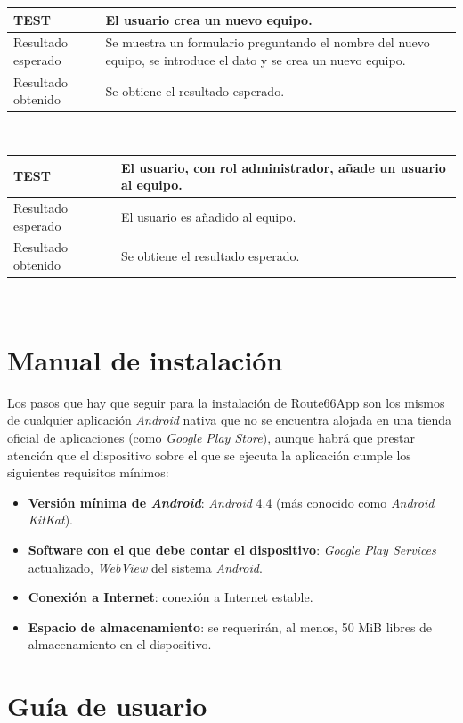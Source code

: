 \documentclass[twoside]{report}
\newcommand\addrow[2]{#1 &#2\\ }
\newcommand\addheading[2]{#1 &#2\\ \hline}
\newcommand\tabularhead{\begin{tabular}{lp{0.7\textwidth}}
\hline
}
\newenvironment{test}{\tabularhead}
{\hline\end{tabular}}
\begin{document}
\vspace{0.5cm}

\begin{test}
  \addheading{\textbf{TEST\arabic{test}}}{El usuario crea un nuevo equipo.} 
  \addrow{Resultado esperado}{Se muestra un formulario preguntando el nombre del nuevo equipo, se introduce el dato y se crea un nuevo equipo.}
  \addrow{Resultado obtenido}{Se obtiene el resultado esperado.}
\end{test}\\

\vspace{0.5cm}

\begin{test}
  \addheading{\textbf{TEST\arabic{test}}}{El usuario, con rol administrador, añade un usuario al equipo.} 
  \addrow{Resultado esperado}{El usuario es añadido al equipo.}
  \addrow{Resultado obtenido}{Se obtiene el resultado esperado.}
\end{test}\\

\section{Manual de instalación}

Los pasos que hay que seguir para la instalación de Route66App son los mismos de cualquier aplicación \textit{Android} nativa que no se encuentra alojada en una tienda oficial de aplicaciones (como \textit{Google Play Store}), aunque habrá que prestar atención que el dispositivo sobre el que se ejecuta la aplicación cumple los siguientes requisitos mínimos:

\begin{itemize}
	\item \textbf{Versión mínima de \textit{Android}}: \textit{Android} 4.4 (más conocido como \textit{Android KitKat}).
	\item \textbf{Software con el que debe contar el dispositivo}: \textit{Google Play Services} actualizado, \textit{WebView} del sistema \textit{Android}.
	\item \textbf{Conexión a Internet}: conexión a Internet estable.
	\item \textbf{Espacio de almacenamiento}: se requerirán, al menos, 50 MiB libres de almacenamiento en el dispositivo.
\end{itemize}

\section{Guía de usuario}
\end{document}
